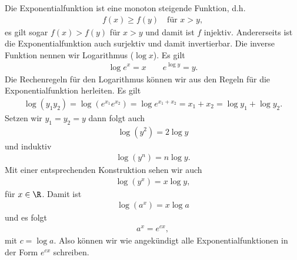 \documentclass[letterpaper,10pt,english]{jupyterBook}
\begin{document}
Die Exponentialfunktion ist eine monoton steigende Funktion, d.h.
\begin{equation*}
\begin{split} f(x) \geq f(y) \quad \text{für } x > y, \end{split}
\end{equation*}
es gilt sogar \(f(x) > f(y)\) für \(x > y\) und damit ist \(f\) injektiv. Andererseits ist die Exponentialfunktion auch surjektiv und damit invertierbar. Die inverse Funktion nennen wir Logarithmus (\(\log x\)). Es gilt
\begin{equation*}
\begin{split} \log e^x = x \qquad e^{\log y} = y. \end{split}
\end{equation*}
Die Rechenregeln für den Logarithmus können wir aus den Regeln für die Exponentialfunktion herleiten. Es gilt
\begin{equation*}
\begin{split} \log (y_1 y_2) = \log (e^{x_1} e^{x_2}) = \log e^{x_1 + x_2} = x_1 + x_2 = \log y_1 + \log y_2. \end{split}
\end{equation*}
Setzen wir \(y_1 = y_2 =y\) dann folgt auch
\begin{equation*}
\begin{split}  \log ( y^2) = 2 \log y \end{split}
\end{equation*}
und induktiv
\begin{equation*}
\begin{split}  \log ( y^n) = n \log y. \end{split}
\end{equation*}
Mit einer entsprechenden Konstruktion sehen wir auch
\begin{equation*}
\begin{split} \log (y^x) = x \log y, \end{split}
\end{equation*}
für \(x \in \R\). Damit ist
\begin{equation*}
\begin{split} \log (a^x) = x \log a \end{split}
\end{equation*}
und es folgt
\begin{equation*}
\begin{split} a^x = e^{c x}, \end{split}
\end{equation*}
mit \(c= \log a\). Also können wir wie angekündigt alle Exponentialfunktionen in der Form \(e^{cx}\) schreiben.
\end{document}
